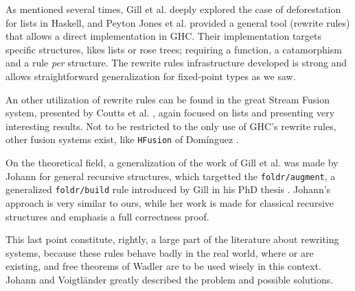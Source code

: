
As mentioned several times, Gill et al. \cite{Gill:1993:SCD:165180.165214} deeply explored the case of deforestation for lists in Haskell, and Peyton Jones et al. \cite{pbr} provided a general tool (rewrite rules) that allows a direct implementation in GHC. Their implementation targets specific structures, likes lists or rose trees; requiring a  function, a catamorphism and a rule \emph{per} structure. The rewrite rules infrastructure developed is strong and allows straightforward generalization for fixed-point types as we saw.

An other utilization of rewrite rules can be found in the great Stream Fusion system, presented by Coutts et al. \cite{Coutts07streamfusion}, again focused on lists and presenting very interesting results.
Not to be restricted to the only use of GHC's rewrite rules, other fusion systems exist, like \verb|HFusion| of Domínguez \cite{dominguez:hfusion}.

On the theoretical field, a generalization of the work of Gill et al. \cite{Gill:1993:SCD:165180.165214} was made by Johann \cite{Johann:2002:GSF:641433.641471} for general recursive structures, which targetted the \verb|foldr/augment|, a generalized \verb|foldr/build| rule introduced by Gill in his PhD thesis \cite{Gill1996CheapDF}. Johann's approach is very similar to ours, while her work is made for classical recursive structures and emphasis a full correctness proof.

This last point constitute, rightly, a large part of the literature about rewriting systems, because these rules behave badly in the real world, where  or  are existing, and free theorems of Wadler \cite{Wadler:1989:TF:99370.99404} are to be used wisely in this context. Johann and Voigtländer \cite{JV04} greatly described the problem and possible solutions.

